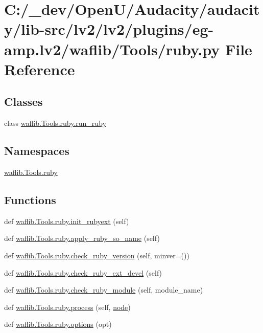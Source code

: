\hypertarget{lv2_2plugins_2eg-amp_8lv2_2waflib_2_tools_2ruby_8py}{}\section{C\+:/\+\_\+dev/\+Open\+U/\+Audacity/audacity/lib-\/src/lv2/lv2/plugins/eg-\/amp.lv2/waflib/\+Tools/ruby.py File Reference}
\label{lv2_2plugins_2eg-amp_8lv2_2waflib_2_tools_2ruby_8py}
\subsection*{Classes}
\begin{DoxyCompactItemize}
\item 
class \hyperlink{classwaflib_1_1_tools_1_1ruby_1_1run__ruby}{waflib.\+Tools.\+ruby.\+run\+\_\+ruby}
\end{DoxyCompactItemize}
\subsection*{Namespaces}
\begin{DoxyCompactItemize}
\item 
 \hyperlink{namespacewaflib_1_1_tools_1_1ruby}{waflib.\+Tools.\+ruby}
\end{DoxyCompactItemize}
\subsection*{Functions}
\begin{DoxyCompactItemize}
\item 
def \hyperlink{namespacewaflib_1_1_tools_1_1ruby_aefe90baeace8b05bd0038dec33a25d4f}{waflib.\+Tools.\+ruby.\+init\+\_\+rubyext} (self)
\item 
def \hyperlink{namespacewaflib_1_1_tools_1_1ruby_a91ccae4c2fd8fd022d9cf0b408b30ba5}{waflib.\+Tools.\+ruby.\+apply\+\_\+ruby\+\_\+so\+\_\+name} (self)
\item 
def \hyperlink{namespacewaflib_1_1_tools_1_1ruby_a6b1426d0a007a1d029dd549463f35792}{waflib.\+Tools.\+ruby.\+check\+\_\+ruby\+\_\+version} (self, minver=())
\item 
def \hyperlink{namespacewaflib_1_1_tools_1_1ruby_a1152f26b41ce01670cf061540c07642a}{waflib.\+Tools.\+ruby.\+check\+\_\+ruby\+\_\+ext\+\_\+devel} (self)
\item 
def \hyperlink{namespacewaflib_1_1_tools_1_1ruby_a56fd37d84970b70e399a27f937a3c8c6}{waflib.\+Tools.\+ruby.\+check\+\_\+ruby\+\_\+module} (self, module\+\_\+name)
\item 
def \hyperlink{namespacewaflib_1_1_tools_1_1ruby_abc8e4baeca74633f0dc718700b547b88}{waflib.\+Tools.\+ruby.\+process} (self, \hyperlink{structnode}{node})
\item 
def \hyperlink{namespacewaflib_1_1_tools_1_1ruby_a81332d72c1973177fb7f913b94ea205d}{waflib.\+Tools.\+ruby.\+options} (opt)
\end{DoxyCompactItemize}
